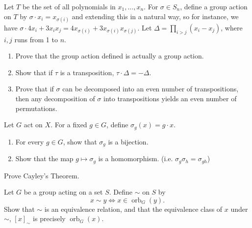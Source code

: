 \documentclass[./main.tex]{subfiles}
\begin{document}
\begin{exercise}
    Let $T$ be the set of all polynomials in $x_1, \dots, x_n$. For $\sigma \in
    S_n$, define a group action on $T$ by $\sigma \cdot x_i = x_{\sigma(i)}$ and
    extending this in a natural way, so for instance, we have $\sigma \cdot 4x_i
    + 3x_i x_j = 4x_{\sigma(i)} + 3 x_{\sigma(i)} x_{\sigma(j)}$. Let $\Delta =
    \prod_{i > j} (x_i - x_j)$, where $i, j$ runs from 1 to $n$.
    
    \begin{enumerate}
        \item Prove that the group action defined is actually a group action.
        \item Show that if $\tau$ is a transposition, $\tau \cdot \Delta = -\Delta$.
        \item Prove that if $\sigma$ can be decomposed into an even number of
        transpositions, then any decomposition of $\sigma$ into transpositions
        yields an even number of permutations.
    \end{enumerate}
\end{exercise}

\begin{exercise}
\label{ex:group-actions-symmetric-group}
    Let $G$ act on $X$. For a fixed $g \in G$, define $\sigma_g(x) = g \cdot x$. 
    \begin{enumerate}
        \item For every $g \in G$, show that $\sigma_g$ is a bijection.
        \item Show that the map $g \mapsto \sigma_g$ is a homomorphism. (i.e.
        $\sigma_g \sigma_h = \sigma_{gh}$)
    \end{enumerate}
\end{exercise}

\begin{exercise}
\label{ex:cayley-thm}
    Prove Cayley's Theorem. 
\end{exercise}

\begin{exercise}
\label{ex:orbits-partition-set}
    Let $G$ be a group acting on a set $S$. Define $\sim$ on $S$ by
    \[
        x \sim y \iff x \in \operatorname{orb}_G (y).
    \]
    Show that $\sim$ is an equivalence relation, and that the equivalence class
    of $x$ under $\sim$, $[x]_\sim$ is precisely $\operatorname{orb}_G(x)$. 
\end{exercise}
\end{document}
